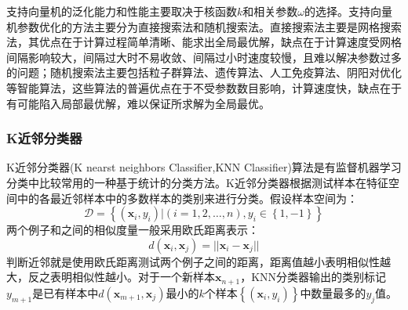 \documentclass[a4paper]{ctexart}
\begin{document}
支持向量机的泛化能力和性能主要取决于核函数$k$和相关参数$\omega$的选择。支持向量机参数优化的方法主要分为直接搜索法和随机搜索法\cite{RN188}。直接搜索法主要是网格搜索法，其优点在于计算过程简单清晰、能求出全局最优解，缺点在于计算速度受网格间隔影响较大，间隔过大时不易收敛、间隔过小时速度较慢，且难以解决参数过多的问题；随机搜索法主要包括粒子群算法\cite{RN189}、遗传算法\cite{RN190}、人工免疫算法\cite{RN187}、阴阳对优化\cite{RN186}等智能算法，这些算法的普遍优点在于不受参数数目影响，计算速度快，缺点在于有可能陷入局部最优解，难以保证所求解为全局最优。

\subsubsection{K近邻分类器}\label{sec:K近邻分类器}
K近邻分类器(K nearst neighbors Classifier,KNN Classifier)算法是有监督机器学习分类中比较常用的一种基于统计的分类方法。K近邻分类器根据测试样本在特征空间中的各最近邻样本中的多数样本的类别来进行分类\cite{RN193}。假设样本空间为：
\begin{equation}
	\mathcal{D}=\left\{(\bm x_i,y_i)|(i=1,2,\dots,n),y_i\in\left\{1,-1\right\}\right\}
\end{equation}
两个例子和之间的相似度量一般采用欧氏距离表示：
\begin{equation}
	d\left(\bm x_i,\bm x_j\right)=||\bm x_i-\bm x_j||
\end{equation}
判断近邻就是使用欧氏距离测试两个例子之间的距离，距离值越小表明相似性越大，反之表明相似性越小。对于一个新样本$\bm x_{n+1}$，KNN分类器输出的类别标记$y_{m+1}$是已有样本中$d\left(\bm x_{m+1},\bm x_j\right)$最小的$k$个样本$\left\{(\bm x_i,y_i)\right\}$中数量最多的$y_j$值\cite{RN194}。
\end{document}
